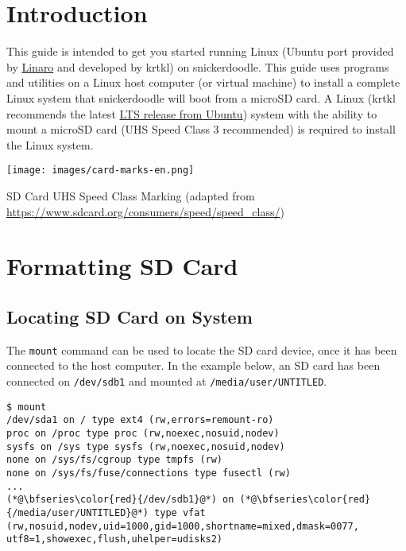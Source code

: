 \section{Introduction}

This guide is intended to get you started running Linux (Ubuntu port provided by \href{http://www.linaro.org}{Linaro} and developed by krtkl) on snickerdoodle. This guide uses programs and utilities on a Linux host computer (or virtual machine) to install a complete Linux system that snickerdoodle will boot from a microSD card. A Linux (krtkl recommends the latest \href{http://www.ubuntu.com/download/desktop/}{LTS release from Ubuntu}) system with the ability to mount a microSD card (UHS Speed Class 3 recommended) is required to install the Linux system.

\begin{marginfigure}
	\centering
	\texttt{[image: images/card-marks-en.png]}
	\caption[SD Card UHS Speed Class Marking adapted from \url{https://www.sdcard.org/consumers/speed/speed_class/}]{SD Card UHS Speed Class Marking (adapted from \url{https://www.sdcard.org/consumers/speed/speed_class/})}
\end{marginfigure}

\section{Formatting SD Card}

\subsection{Locating SD Card on System}
\label{sub:locatesd}

The \texttt{mount} command can be used to locate the SD card device, once it has been connected to the host computer. In the example below, an SD card has been connected on \texttt{/dev/sdb1} and mounted at \texttt{/media/user/UNTITLED}. \\

\begin{lstlisting}[style=text]
$ mount
/dev/sda1 on / type ext4 (rw,errors=remount-ro)
proc on /proc type proc (rw,noexec,nosuid,nodev)
sysfs on /sys type sysfs (rw,noexec,nosuid,nodev)
none on /sys/fs/cgroup type tmpfs (rw)
none on /sys/fs/fuse/connections type fusectl (rw)
...
(*@\bfseries\color{red}{/dev/sdb1}@*) on (*@\bfseries\color{red}{/media/user/UNTITLED}@*) type vfat (rw,nosuid,nodev,uid=1000,gid=1000,shortname=mixed,dmask=0077, utf8=1,showexec,flush,uhelper=udisks2)
\end{lstlisting}


